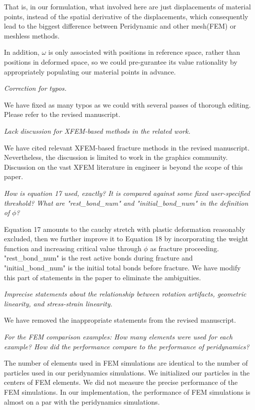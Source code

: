 That is, in our formulation, what involved here are just displacements of material points,
instead of the spatial derivative of the displacements, which consequently lead to the biggest difference between Peridynamic and other mesh(FEM) or meshless methods.

In addition, $\omega$ is only associated with positions in reference space, rather than positions in deformed space,
so we could pre-gurantee its value rationality by appropriately populating our material points in advance.

\emph{Correction for typos.}

We have fixed as many typos as we could with several passes of thorough editing. Please refer to the revised manuscript.

\emph{Lack discussion for XFEM-based methods in the related work.}

We have cited relevant XFEM-based fracture methods in the revised manuscript. Nevertheless, the discussion is limited to work in the graphics community. Discussion on the vast XFEM literature in engineer is beyond the scope of this paper.

\emph{How is equation 17 used, exactly? It is compared against some fixed user-specified threshold? What are "rest\_bond\_num" and "initial\_bond\_num" in the definition of $\phi$?}

Equation 17 amounts to the cauchy stretch with plastic deformation reasonably excluded, then we further improve it to Equation 18 by incorporating the weight function and increasing critical value through $\phi$ as fracture proceeding. "rest\_bond\_num" is the rest active bonds during fracture and "initial\_bond\_num" is the initial total bonds before fracture. We have modify this part of statements in the paper to eliminate the ambiguities.

\emph{Imprecise statements about the relationship between rotation artifacts, geometric linearity, and stress-strain linearity.}

We have removed the inappropriate statements from the revised manuscript.

\emph{For the FEM comparison examples: How many elements were used for each example? How did the performance compare to the performance of peridynamics?}

The number of elements used in FEM simulations are identical to the number of particles used in our peridynamics simulations. We initialized our particles in the centers of FEM elements. We did not measure the precise performance of the FEM simulations. In our implementation, the performance of FEM simulations is almost on a par with the peridynamics simulations.

